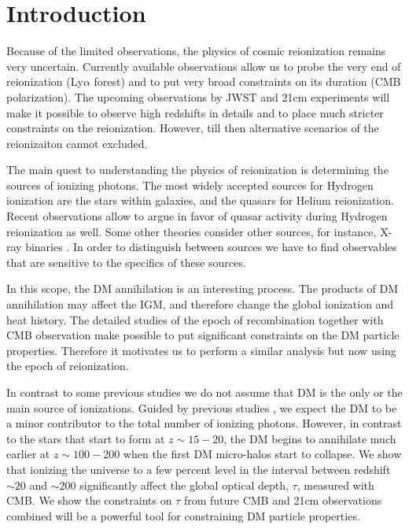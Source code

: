 \section{Introduction}

Because of the limited observations, the physics of cosmic reionization remains very uncertain. Currently available observations allow us to probe the very end of reionization (Ly$\alpha$ forest) and to put very broad constraints on its duration (CMB polarization). The upcoming observations by JWST and 21cm experiments will make it possible to observe high redshifts in details and to place much stricter constraints on the reionization. However, till then alternative scenarios of the reionizaiton cannot excluded.

The main quest to understanding the physics of reionization is determining the sources of ionizing photons. The most widely accepted sources for Hydrogen ionization are the stars within galaxies, and the quasars for Helium reionization. Recent observations allow \cite{2015arXiv150707678M} to argue in favor of quasar activity during Hydrogen reionization as well. Some other theories consider other sources, for instance, X-ray binaries \cite{Fialkov_2014}. In order to distinguish between sources we have to find observables that are sensitive to the specifics of these sources.

In this scope, the DM annihilation is an interesting process. The products of DM annihilation may affect the IGM, and therefore change the global ionization and heat history. The detailed studies of the epoch of recombination \citet{2015arXiv150603811S} together with CMB observation \cite{2015arXiv150201589P} make possible to put significant constraints on the DM particle properties. Therefore it motivates us to perform a similar analysis but now using the epoch of reionization. 

In contrast to some previous studies \cite{2009JCAP...10..009C, 2009PhRvD..80c5007B} we do not assume that DM is the only or the main source of ionizations. Guided by previous studies \cite{H_tsi_2009}, we expect the DM to be a minor contributor to the total number of ionizing photons. However, in contrast to the stars that start to form at $z\sim 15-20$, the DM begins to annihilate much earlier at $z\sim100-200$ when the first DM micro-halos start to collapse. We show that ionizing the universe to a few percent level in the interval between redshift $\sim20$ and $\sim200$ significantly affect the global optical depth, $\tau$, measured with CMB. We show the constraints on $\tau$ from future CMB and 21cm observations combined will be a powerful tool for constraining DM particle properties.

